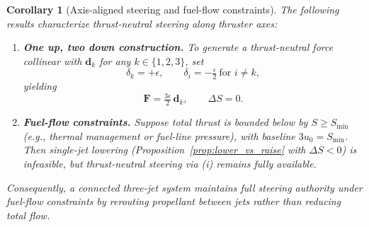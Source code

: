 \documentclass{article}
\newtheorem{corollary}{Corollary}
\begin{document}
\begin{corollary}[Axis-aligned steering and fuel-flow constraints]
\label{cor:one_up_two_down}
The following results characterize thrust-neutral steering along thruster axes:

\begin{enumerate}
\item[\textup{(i)}] \textbf{One up, two down construction.}
To generate a thrust-neutral force collinear with $\mathbf d_k$ for any $k \in \{1,2,3\}$, 
set
\begin{equation}
\delta_k = +\epsilon, \qquad \delta_i = -\tfrac{\epsilon}{2} \ \text{for } i \neq k,
\end{equation}
yielding
\begin{equation}
\mathbf F = \tfrac{3\epsilon}{2}\,\mathbf d_k, \qquad \Delta S = 0.
\end{equation}

\item[\textup{(ii)}] \textbf{Fuel-flow constraints.}
Suppose total thrust is bounded below by $S \ge S_{\min}$ (e.g., thermal management or 
fuel-line pressure), with baseline $3u_0 = S_{\min}$. Then single-jet lowering 
(Proposition~\ref{prop:lower_vs_raise} with $\Delta S < 0$) is infeasible, but thrust-neutral 
steering via (i) remains fully available.
\end{enumerate}

Consequently, a connected three-jet system maintains full steering authority under fuel-flow 
constraints by \emph{rerouting} propellant between jets rather than reducing total flow.
\end{corollary}
\end{document}
